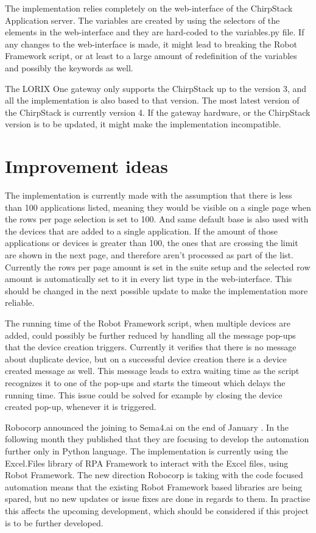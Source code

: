 The implementation relies completely on the web-interface of the ChirpStack Application server.
The variables are created by using the selectors of the elements in the web-interface and they are hard-coded to the variables.py file.
If any changes to the web-interface is made, it might lead to breaking the Robot Framework script, or at least to a large amount of redefinition of the variables and possibly the keywords as well.

The LORIX One gateway only supports the ChirpStack up to the version 3, and all the implementation is also based to that version.
The most latest version of the ChirpStack is currently version 4.
If the gateway hardware, or the ChirpStack version is to be updated, it might make the implementation incompatible.

\section{Improvement ideas}

The implementation is currently made with the assumption that there is less than 100 applications listed, meaning they would be visible on a single page when the rows per page selection is set to 100.
And same default base is also used with the devices that are added to a single application.
If the amount of those applications or devices is greater than 100, the ones that are crossing the limit are shown in the next page,  and therefore aren't processed as part of the list.
Currently the rows per page amount is set in the suite setup and the selected row amount is automatically set to it in every list type in the web-interface.
This should be changed in the next possible update to make the implementation more reliable.

The running time of the Robot Framework script, when multiple devices are added, could possibly be further reduced by handling all the message pop-ups that the device creation triggers.
Currently it verifies that there is no message about duplicate device, but on a successful device creation there is a device created message as well. 
This message leads to extra waiting time as the script recognizes it to one of the pop-ups and starts the timeout which delays the running time.
This issue could be solved for example by closing the device created pop-up, whenever it is triggered.

Robocorp announced the joining to Sema4.ai on the end of January \cite{robocorp:sema4.ai}.
In the following month they published that they are focusing to develop the automation further only in Python language.
The implementation is currently using the Excel.Files library of RPA Framework to interact with the Excel files, using Robot Framework.
The new direction Robocorp is taking with the code focused automation means that the existing Robot Framework based libraries are being spared, but no new updates or issue fixes are done in regards to them.
In practise this affects the upcoming development, which should be considered if this project is to be further developed.

